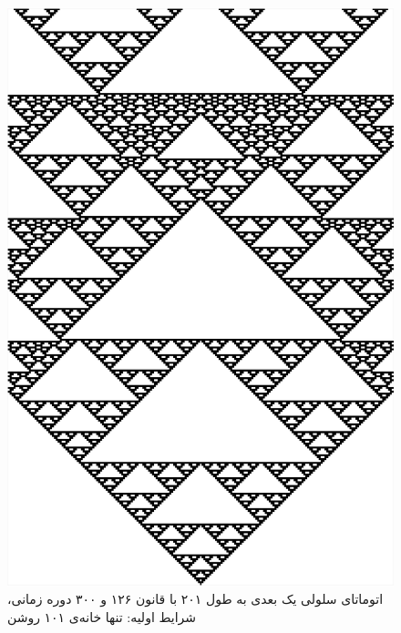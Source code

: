 \documentclass[11pt, a4paper]{article}
\begin{document}
\begin{figure}[!tbp]
  \begin{minipage}[b]{0.3\textwidth}
    \includegraphics[width=\textwidth]{q3-126}
    \caption{اتوماتای سلولی یک بعدی به طول ۲۰۱ با قانون ۱۲۶ و ۳۰۰ دوره زمانی، شرایط اولیه: تنها خانه‌ی ۱۰۱ روشن}
    \label{fig:q3-126}
  \end{minipage}
  \hfill
  \begin{minipage}[b]{0.3\textwidth}

\end{minipage}
\end{figure}
\end{document}
